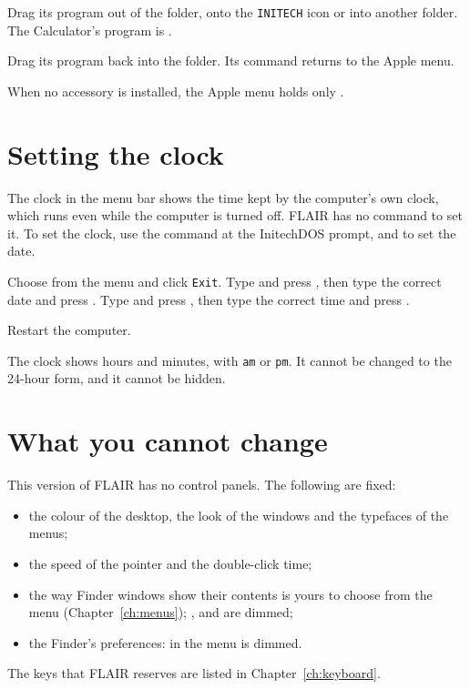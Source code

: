 Drag its program out of the 
folder, onto the \texttt{INITECH} icon or into another folder.  The
Calculator's program is .


Drag its program back into the 
folder.  Its command returns to the Apple menu.

When no accessory is installed, the Apple menu holds only
.

\section{Setting the clock}
The clock in the menu bar shows the time kept by the computer's own clock,
which runs even while the computer is turned off.  FLAIR has no command to
set it.  To set the clock, use the  command at the InitechDOS
prompt, and  to set the date.
\begin{TaskSteps}
\Step Choose  from the  menu
and click \texttt{Exit}.
\Step Type  and press , then type the correct date and
press .  Type  and press , then type the
correct time and press .
\end{TaskSteps}


\begin{TaskSteps}[resume]
\Step Restart the computer.
\end{TaskSteps}

The clock shows hours and minutes, with \texttt{am} or \texttt{pm}.  It
cannot be changed to the 24-hour form, and it cannot be hidden.

\section{What you cannot change}
This version of FLAIR has no control panels.  The following are fixed:
\begin{itemize}
\item the colour of the desktop, the look of the windows and the
  typefaces of the menus;
\item the speed of the pointer and the double-click time;
\item the way Finder windows show their contents is yours to choose from
  the  menu (Chapter~\ref{ch:menus}); ,
   and  are dimmed;
\item the Finder's preferences:  in the
   menu is dimmed.
\end{itemize}
The keys that FLAIR reserves are listed in Chapter~\ref{ch:keyboard}.
